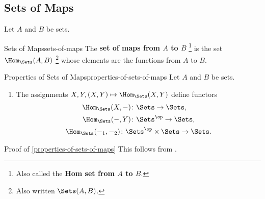 \subsection{Sets of Maps}\label{subsection-sets-of-maps}
Let $A$ and $B$ be sets.
\begin{definition}{Sets of Maps}{sets-of-maps}%
    The \textbf{set of maps from $A$ to $B$}%
    \footnote{%
        Also called the \textbf{Hom set from $A$ to $B$}.
    } %
    is the set $\Hom_{\Sets}(A,B)$%
    \footnote{%
        Also written $\Sets(A,B)$.
        \par\vspace*{-1.75\baselineskip}
    } %
    whose elements are the functions from $A$ to $B$.
\end{definition}
\begin{proposition}{Properties of Sets of Maps}{properties-of-sets-of-maps}%
    Let $A$ and $B$ be sets.
    \begin{enumerate}
        \item\label{properties-of-sets-of-maps-functoriality}The assignments $X,Y,(X,Y)\mapsto\Hom_{\Sets}(X,Y)$ define functors
            \begin{gather*}
                \begin{aligned}
                    \Hom_{\Sets}(X,-)    &\colon                  \Sets \to \Sets,\\
                    \Hom_{\Sets}(-,Y)    &\colon \Sets^{\op}            \to \Sets,
                \end{aligned}\\
                \Hom_{\Sets}(-_{1},-_{2}) \colon \Sets^{\op}\times\Sets \to \Sets.
            \end{gather*}
    \end{enumerate}
\end{proposition}
\begin{Proof}{Proof of \cref{properties-of-sets-of-maps}}%
    This follows from .
\end{Proof}
